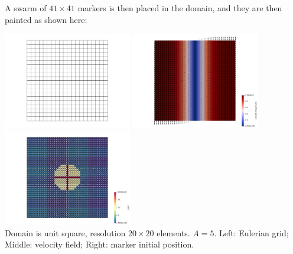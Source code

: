 A swarm of $41\times41$ markers is then placed in the domain, 
and they are then painted as shown here:
\begin{center}
\includegraphics[width=5.6cm]{python_codes/fieldstone_89/results/shearband/init/grid}
\includegraphics[width=5.6cm]{python_codes/fieldstone_89/results/shearband/init/vel}
\includegraphics[width=5.6cm]{python_codes/fieldstone_89/results/shearband/init/markers}\\
{\captionfont Domain is unit square, resolution $20\times20$ elements. $A=5$. 
Left: Eulerian grid; Middle: velocity field; Right: marker initial position.}
\end{center}


